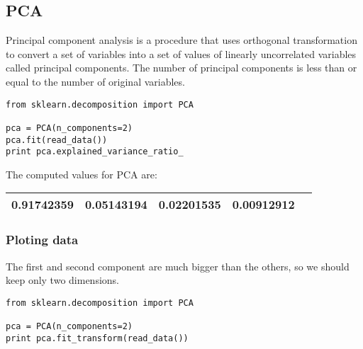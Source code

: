 \documentclass{article}
\begin{document}
\subsection{PCA}
Principal component analysis is a procedure that uses orthogonal transformation to convert a set of variables into a set of values of linearly uncorrelated variables called principal components. The number of principal components is less than or equal to the number of original variables.

\begin{lstlisting}[frame=single]
from sklearn.decomposition import PCA

pca = PCA(n_components=2)
pca.fit(read_data())
print pca.explained_variance_ratio_
\end{lstlisting}

The computed values for PCA are:
\begin{table}[h]
    \begin{tabular}{|l|l|l|l|l}
        \hline
        0.91742359 &  0.05143194 &  0.02201535 & 0.00912912 \\ \hline
    \end{tabular}
\end{table}

\subsubsection{Ploting data}

The first and second component are much bigger than the others, so we should keep only two dimensions.


\begin{lstlisting}[frame=single]
from sklearn.decomposition import PCA

pca = PCA(n_components=2)
print pca.fit_transform(read_data())
\end{lstlisting}
\end{document}
